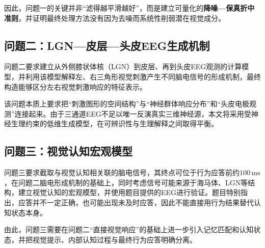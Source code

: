 因此，问题一的关键并非“滤得越平滑越好”，而是建立可量化的\textbf{降噪—保真折中准则}，并证明最终处理方法没有因为去噪而系统性削弱潜在视觉成分。

\subsection{问题二：LGN—皮层—头皮EEG生成机制}

问题二要求建立从外侧膝状体核（LGN）到皮层、再到头皮EEG观测的计算模型，并利用该模型解释左、右三角形视觉刺激产生不同脑电信号的形成机制，最终构造能够区分左右视觉刺激响应的特征表示。

该问题本质上要求把“刺激图形的空间结构”与“神经群体响应分布”和“头皮电极观测”连接起来。由于三通道EEG不足以唯一反演真实三维神经源，本文将采用受神经生理约束的低维生成模型，在可辨识性与生理解释之间取得平衡。

\subsection{问题三：视觉认知宏观模型}

问题三要求截取与视觉认知相关联的脑电信号，其终点可位于行为应答前约$100\,\mathrm{ms}$，在问题二脑电形成机制的基础上，同时考虑信号可能来源于海马体、LGN等结构，建立视觉认知的宏观模型，并使用题目提供的EEG进行验证。题目特别指出，应答并不一定正确，也可能出现未及时应答，因此不能直接用行为结果替代认知状态本身。

由此，问题三需要在问题二“直接视觉响应”的基础上进一步引入记忆匹配和认知状态，并把视觉提示、内部认知过程与最终行为应答明确分离。
